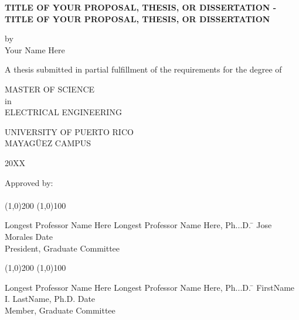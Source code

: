 



\thispagestyle{empty}
\begin{center}
\begin{singlespace}
\textbf{TITLE OF YOUR PROPOSAL, THESIS, OR DISSERTATION - TITLE OF YOUR PROPOSAL, THESIS, OR DISSERTATION}
\end{singlespace}
\vspace{4 mm}
by
\\
\vspace{4 mm}
Your Name Here %
\vspace{4 mm}
\begin{singlespace}
A thesis submitted in partial fulfillment of the requirements for the degree of %
\end{singlespace}
\vspace{4 mm}
MASTER OF SCIENCE %
\\
in
\\
ELECTRICAL ENGINEERING %
\\
\vspace{4 mm}
\begin{singlespace}

UNIVERSITY OF PUERTO RICO
\\
MAYAG\"UEZ CAMPUS
\end{singlespace}

20XX %
\end{center}
\bigskip
\bigskip
\bigskip
\bigskip
\bigskip
\bigskip
\bigskip

  \noindent Approved by:
\\
\\

  \noindent
\line(1,0){200} \hspace{40 mm} \line(1,0){100}\\
  \noindent
\vspace{-1.75\baselineskip}
  \begin{tabbing}
Longest Professor Name Here Longest Professor Name Here, Ph...D. \=  \kill 
Jose Morales \>  Date\\President, Graduate Committee  %
\end{tabbing}



  \noindent
\line(1,0){200} \hspace{40 mm} \line(1,0){100}\\
  \noindent
\vspace{-1.75\baselineskip}
  \begin{tabbing}
Longest Professor Name Here Longest Professor Name Here, Ph...D. \=  \kill 
FirstName I. LastName, Ph.D. \>  Date\\Member, Graduate Committee  %
\end{tabbing}


